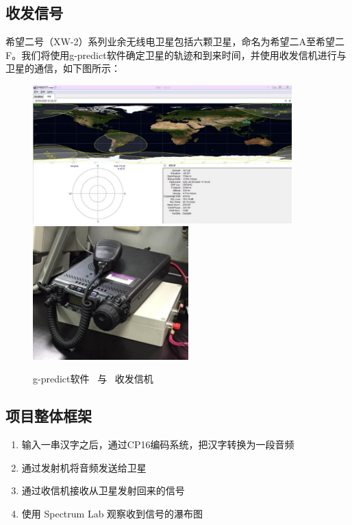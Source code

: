 \documentclass[UTF8, a4paper]{ctexart}
\begin{document}
  
  \subsection{收发信号}
  希望二号（XW-2）系列业余无线电卫星包括六颗卫星，命名为希望二A至希望二F。我们将使用g-predict软件确定卫星的轨迹和到来时间，并使用收发信机进行与卫星的通信，如下图所示：
     \begin{figure}[H]
     \begin{minipage}[H]{1\linewidth}
       \centering
       \includegraphics[width=10cm]{figure/gpredict.png}
       \includegraphics[width=6cm]{figure/trans-reciever.png}
     \end{minipage}
     \caption{g-predict软件 ~与~ 收发信机}
   \end{figure}
   
   
   \subsection{项目整体框架}
   \begin{enumerate}
   	\item 输入一串汉字之后，通过CP16编码系统，把汉字转换为一段音频
	\item 通过发射机将音频发送给卫星
	\item 通过收信机接收从卫星发射回来的信号
	\item 使用 Spectrum Lab 观察收到信号的瀑布图
  \end{enumerate}
   
\end{document}
